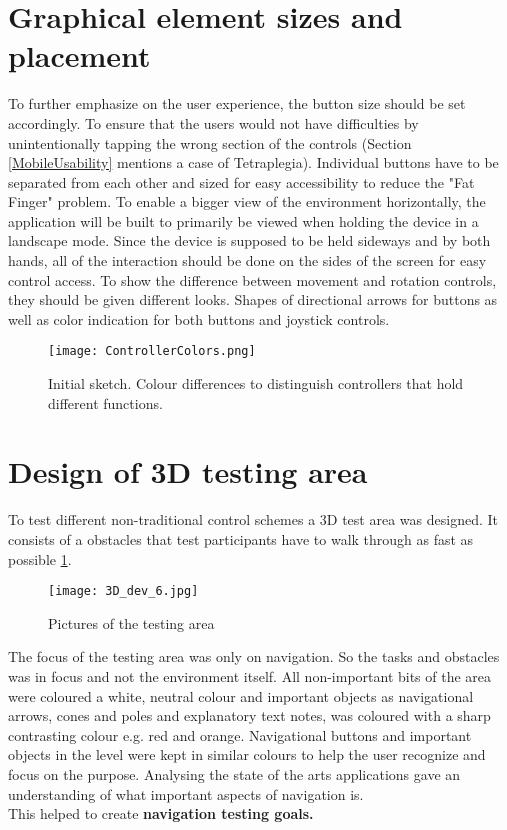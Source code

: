 \section{Graphical element sizes and placement}
To further emphasize on the user experience, the button size should be set accordingly. To ensure that the users would not have difficulties by unintentionally tapping the wrong section of the controls (Section \ref{MobileUsability} mentions a case of Tetraplegia). Individual buttons have to be separated from each other and sized for easy accessibility to reduce the "Fat Finger" problem. To enable a bigger view of the environment horizontally, the application will be built to primarily be viewed when holding the device in a landscape mode. Since the device is supposed to be held sideways and by both hands, all of the interaction should be done on the sides of the screen for easy control access.
To show the difference between movement and rotation controls, they should be given different looks. Shapes of directional arrows for buttons as well as color indication for both buttons and joystick controls.

\begin{figure}[H]
\centering
\texttt{[image: ControllerColors.png]}
\caption{Initial sketch. Colour differences to distinguish controllers that hold different functions.}
\end{figure}

\section{Design of 3D testing area}
To test different non-traditional control schemes a 3D test area was designed. It consists of a obstacles that test participants have to walk through as fast as possible \ref{TestLevels}.

\begin{figure}[H]
\centering
\texttt{[image: 3D\_dev\_6.jpg]}
\caption{Pictures of the testing area}
\label{TestLevels}
\end{figure}

The focus of the testing area was only on navigation. So the tasks and obstacles was in focus and not the environment itself. All non-important bits of the area were coloured a white, neutral colour and important objects as navigational arrows, cones and poles and explanatory text notes, was coloured with a sharp contrasting colour e.g. red and orange. Navigational buttons and important objects in the level were kept in similar colours to help the user recognize and focus on the purpose. 
Analysing the state of the arts applications gave an understanding of what important aspects of navigation is.
\\
This helped to create \textbf{navigation testing goals.}

